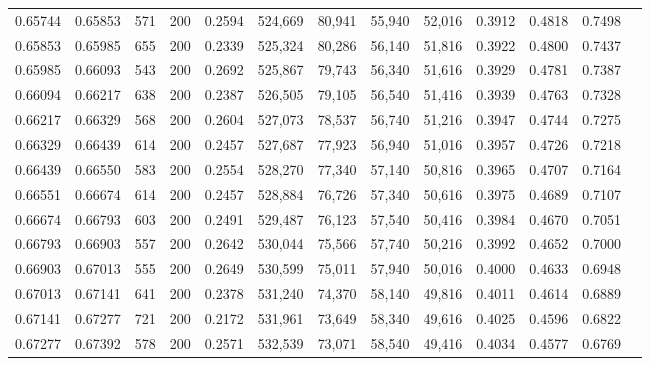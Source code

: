 \begin{tabular}{rrrrrrrrrrrrr}
0.65744 & 0.65853 &    571 & 200 &                                     0.2594 & 524,669 &  80,941 &  55,940 &  52,016 & 0.3912 & 0.4818 & 0.7498 \\
0.65853 & 0.65985 &    655 & 200 &                                     0.2339 & 525,324 &  80,286 &  56,140 &  51,816 & 0.3922 & 0.4800 & 0.7437 \\
0.65985 & 0.66093 &    543 & 200 &                                     0.2692 & 525,867 &  79,743 &  56,340 &  51,616 & 0.3929 & 0.4781 & 0.7387 \\
0.66094 & 0.66217 &    638 & 200 &                                     0.2387 & 526,505 &  79,105 &  56,540 &  51,416 & 0.3939 & 0.4763 & 0.7328 \\
0.66217 & 0.66329 &    568 & 200 &                                     0.2604 & 527,073 &  78,537 &  56,740 &  51,216 & 0.3947 & 0.4744 & 0.7275 \\
0.66329 & 0.66439 &    614 & 200 &                                     0.2457 & 527,687 &  77,923 &  56,940 &  51,016 & 0.3957 & 0.4726 & 0.7218 \\
0.66439 & 0.66550 &    583 & 200 &                                     0.2554 & 528,270 &  77,340 &  57,140 &  50,816 & 0.3965 & 0.4707 & 0.7164 \\
0.66551 & 0.66674 &    614 & 200 &                                     0.2457 & 528,884 &  76,726 &  57,340 &  50,616 & 0.3975 & 0.4689 & 0.7107 \\
0.66674 & 0.66793 &    603 & 200 &                                     0.2491 & 529,487 &  76,123 &  57,540 &  50,416 & 0.3984 & 0.4670 & 0.7051 \\
0.66793 & 0.66903 &    557 & 200 &                                     0.2642 & 530,044 &  75,566 &  57,740 &  50,216 & 0.3992 & 0.4652 & 0.7000 \\
0.66903 & 0.67013 &    555 & 200 &                                     0.2649 & 530,599 &  75,011 &  57,940 &  50,016 & 0.4000 & 0.4633 & 0.6948 \\
0.67013 & 0.67141 &    641 & 200 &                                     0.2378 & 531,240 &  74,370 &  58,140 &  49,816 & 0.4011 & 0.4614 & 0.6889 \\
0.67141 & 0.67277 &    721 & 200 &                                     0.2172 & 531,961 &  73,649 &  58,340 &  49,616 & 0.4025 & 0.4596 & 0.6822 \\
0.67277 & 0.67392 &    578 & 200 &                                     0.2571 & 532,539 &  73,071 &  58,540 &  49,416 & 0.4034 & 0.4577 & 0.6769 \\

\end{tabular}
